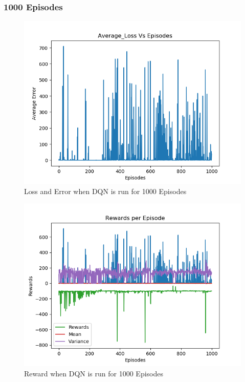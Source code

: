 \documentclass[doc, onecolumn, 12pt]{apa6}
\begin{document}
\FloatBarrier
\subsubsection{1000 Episodes}
\begin{figure}[H]
\label{DQN_1000Ep_Error}
\includegraphics[width =\textwidth, height=0.4 \textheight]{results/dqn/1000_ep/Error.png}
\caption{Loss and Error when DQN is run for 1000 Episodes}
\end{figure}

\begin{figure}
\label{DQN_1000Ep_Rewards}
\includegraphics[width =\textwidth, height=0.4 \textheight]{results/dqn/1000_ep/Rewards.png}
\caption{Reward  when DQN is run for 1000 Episodes}
\end{figure}
\end{document}
